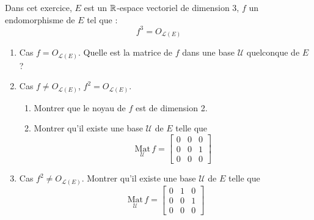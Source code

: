Dans cet exercice, $E$ est un $\mathbb{R}$-espace vectoriel de dimension 3, $f$ un endomorphisme de $E$ tel que :
\[f^3 = O_{\mathcal{L}(E)}\]
\begin{enumerate}
\item Cas $f = O_{\mathcal{L}(E)}$.\newline
Quelle est la matrice de $f$ dans une base $\mathcal{U}$ quelconque de $E$ ?
\item Cas $f \neq O_{\mathcal{L}(E)}$, $f^2 = O_{\mathcal{L}(E)}$.
\begin{enumerate}
\item Montrer que le noyau de $f$ est de dimension 2.
\item Montrer qu'il existe une base $\mathcal{U}$ de $E$ telle que 
\[\underset{\mathcal{U}}{\mathrm{Mat}}\, f   =\left[
\begin{array}{ccc}
0 & 0 & 0 \\
0 & 0 & 1 \\
0 & 0 & 0	
\end{array}\right]
\] 
\end{enumerate}

\item Cas $f^2 \neq O_{\mathcal{L}(E)}$.\newline
Montrer qu'il existe une base $\mathcal{U}$ de $E$ telle que 
\[\underset{\mathcal{U}}{\mathrm{Mat}}\, f  =\left[
\begin{array}{ccc}
0 & 1 & 0 \\
0 & 0 & 1 \\
0 & 0 & 0	
\end{array}\right]
\]
\end{enumerate}